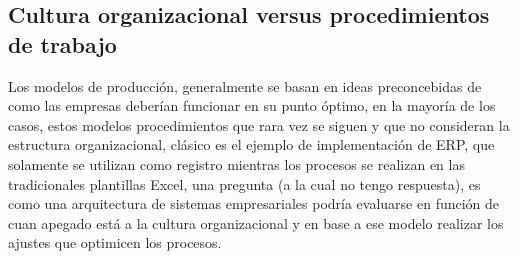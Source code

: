 \documentclass{article}
\begin{document}
\subsection{Cultura organizacional versus procedimientos de trabajo}

Los modelos de producción, generalmente se basan en ideas preconcebidas de como las empresas deberían funcionar en su punto óptimo, en la mayoría de los casos, estos modelos procedimientos que rara vez se siguen y que no consideran la estructura organizacional, clásico es el ejemplo de implementación de ERP, que solamente se utilizan como registro mientras los procesos se realizan en las tradicionales plantillas Excel, una pregunta (a la cual no tengo respuesta), es como una arquitectura de sistemas empresariales podría evaluarse en función de cuan apegado está a la cultura organizacional y en base a ese modelo realizar los ajustes que optimicen los procesos.


\nocite{*}
    
\end{document}
